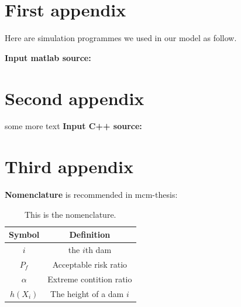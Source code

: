 \documentclass{mcmthesis}
\begin{document}
\begin{appendices}

\section{First appendix}

\lipsum[13]

Here are simulation programmes we used in our model as follow.

\textbf{\textcolor[rgb]{0.98,0.00,0.00}{Input matlab source:}}


\section{Second appendix}

some more text \textcolor[rgb]{0.98,0.00,0.00}{\textbf{Input C++ source:}}


\section{Third appendix}

\textcolor[rgb]{0.98,0.00,0.00}{\textbf{Nomenclature}} is recommended in mcm-thesis:

\begin{table}[h]
  \centering
  \begin{tabular}{cc}
    \hline
Symbol        & Definition  \\
\hline
$i$           & the $i$th dam                 \\
$P_{f}$       & Acceptable risk ratio         \\
$\alpha$      & Extreme contition ratio        \\
$h(X_{i})$    & The height of a dam $i$        \\
\hline
  \end{tabular}
  \caption{This is the nomenclature.} \label{tab:sometab}
\end{table}




\end{appendices}
\end{document}
